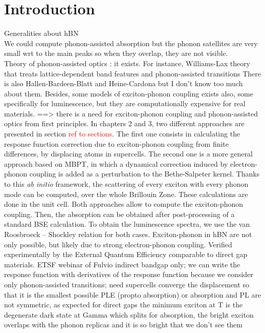 \chapter*{Introduction}
Generalities about hBN \\
We could compute phonon-assisted absorption but the phonon satellites are very small wrt to the main peaks so when they overlap, they are not visible.\\
Theory of phonon-assisted optics : it exists. For instance, Williams-Lax theory that treats lattice-dependent band features and phonon-assisted transitions 
There is also Hallen-Bardeen-Blatt and Heine-Cardona but I don't know too much about them.
Besides, some models of exciton-phonon coupling exists also, some specifically for luminescence, but they are computationally expensive for real materials.
==> there is a need for exciton-phonon coupling and phonon-assisted optics from first principles. In chapters 2 and 3, two different approaches are presented in section \textcolor{red}{ref to sections}. The first one consists in calculating the response function correction due to exciton-phonon coupling from finite differences, by displacing atoms in supercells. The second one is a more general approach based on \acrshort{MBPT}, in which a dynamical correction induced by electron-phonon coupling is added as a perturbation to the Bethe-Salpeter kernel. Thanks to this \textit{ab initio} framework, the scattering of every exciton with every phonon mode can be computed, over the whole Brillouin Zone. These calculations are done in the unit cell.
Both approaches allow to compute the exciton-phonon coupling. Then, the absorption can be obtained after post-processing of a standard \acrshort{BSE} calculation. To obtain the luminescence spectra, we use the van Roosbroeck -- Shockley relation for both cases.
Exciton-phonon in hBN are not only possible, but likely due to strong electron-phonon coupling. Verified experimentally by the External Quantum Efficiency comparable to direct gap materials.
%
%
%
ETSF webinar of Fulvio
indirect bandgap only; we can write the response function with derivatives of the response function because we consider only phonon-assisted transitions; need supercells
converge the displacement so that it is the smallest possible
PLE (propto absorption) or absorption and PL are not symmetric, as expected for direct gaps
the minimum exciton at T is the degenerate dark state at Gamma which splits
for absorption, the bright exciton overlaps with the phonon replicas and it is so bright that we don't see them 